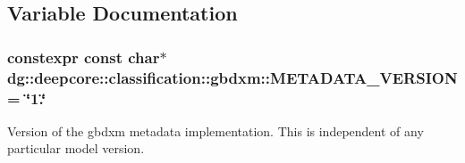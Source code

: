 \subsection{Variable Documentation}
\subsubsection[{\texorpdfstring{M\+E\+T\+A\+D\+A\+T\+A\+\_\+\+V\+E\+R\+S\+I\+ON}{METADATA_VERSION}}]{\setlength{\rightskip}{0pt plus 5cm}constexpr const char$\ast$ dg\+::deepcore\+::classification\+::gbdxm\+::\+M\+E\+T\+A\+D\+A\+T\+A\+\_\+\+V\+E\+R\+S\+I\+ON = \char`\"{}1.\char`\"{}}\hypertarget{namespacedg_1_1deepcore_1_1classification_1_1gbdxm_ab948a3612d9b3c1147ed4fcc38279167}{}\label{namespacedg_1_1deepcore_1_1classification_1_1gbdxm_ab948a3612d9b3c1147ed4fcc38279167}


Version of the gbdxm metadata implementation. This is independent of any particular model version. 


